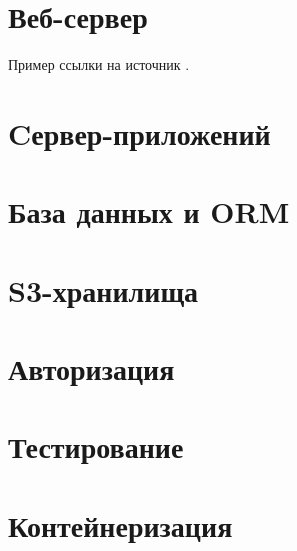 \section{Веб-сервер}
Пример ссылки на источник \cite{Kormen}.

\section{Cервер-приложений}
\section{База данных и ORM}
\section{S3-хранилища}
\section{Авторизация}
\section{Тестирование}
\section{Контейнеризация}
\pagebreak
